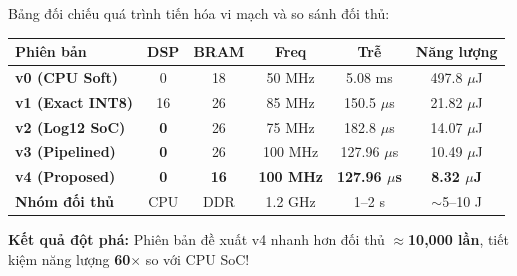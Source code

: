 \documentclass[10pt]{article}
\begin{document}
\begin{minipage}[t]{0.323\textwidth}\vspace{0pt}
    \begin{tcolorbox}[colorcard={socRed}{7. NGHIÊN CỨU TIẾN HÓA 4 GIAI ĐOẠN \& SO SÁNH}]
        {\fontsize{7.2}{8.3}\selectfont
        Bảng đối chiếu quá trình tiến hóa vi mạch và so sánh đối thủ:
        \vspace{1mm}
        
        \begin{tabularx}{\linewidth}{Xccccc}
            \toprule
            \textbf{Phiên bản} & \textbf{DSP} & \textbf{BRAM} & \textbf{Freq} & \textbf{Trễ} & \textbf{Năng lượng} \\
            \midrule
            \textbf{v0 (CPU Soft)} & 0 & 18 & 50 MHz & 5.08 ms & 497.8 $\mu$J \\
            \textbf{v1 (Exact INT8)} & 16 & 26 & 85 MHz & 150.5 $\mu$s & 21.82 $\mu$J \\
            \textbf{v2 (Log12 SoC)} & \textbf{0} & 26 & 75 MHz & 182.8 $\mu$s & 14.07 $\mu$J \\
            \textbf{v3 (Pipelined)} & \textbf{0} & 26 & 100 MHz & 127.96 $\mu$s & 10.49 $\mu$J \\
            \rowcolor{socGreenLight}
            \textbf{v4 (Proposed)} & \textbf{0} & \textbf{16} & \textbf{100 MHz} & \textbf{127.96 $\mu$s} & \textbf{8.32 $\mu$J} \\
            \midrule
            \textbf{Nhóm đối thủ} & CPU & DDR & 1.2 GHz & 1--2 s & $\sim$5--10 J \\
            \bottomrule
        \end{tabularx}
        \vspace{1mm}
        
        \textbf{Kết quả đột phá:} Phiên bản đề xuất v4 nhanh hơn đối thủ $\approx$\textbf{10,000 lần}, tiết kiệm năng lượng \textbf{60$\times$} so với CPU SoC!}
    \end{tcolorbox}
    
    \vspace{4.4mm}
    

\end{minipage}
\end{document}
